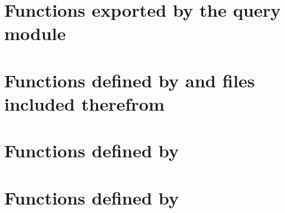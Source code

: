 \documentclass[english,a4paper,11pt,oldtoc,mctitle]{rapport3}
\begin{document}


\section{Functions exported by the query module}
\label{sec:queryref}



\section{Functions defined by  and files included
therefrom}
\label{sec:ioncorelibref}



\section{Functions defined by }
\label{sec:mplexfnsref}



\section{Functions defined by }
\label{sec:querylibref}



\appendix



\printindex
\end{document}
